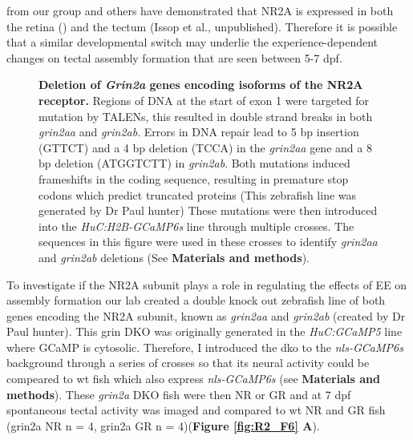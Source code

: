 from our group and others have demonstrated that NR2A is expressed in both the retina (\cite{Cox2005MolecularZebrafish}) and the tectum (Issop et al., unpublished). Therefore it is possible that a similar developmental switch may underlie the experience-dependent changes on tectal assembly formation that are seen between 5-7 \gls{dpf}.

\begin{figure}[!ht]
            \caption[\label{fig:R2_F5} \textbf{Deletion of \textit{grin2a} genes encoding isoforms of the NR2A receptor.}]{\label{fig:R2_F5} \textbf{Deletion of \textit{Grin2a} genes encoding isoforms of the NR2A receptor.} Regions of DNA at the start of exon 1 were targeted for mutation by TALENs, this resulted in double strand breaks in both \textit{grin2aa} and \textit{grin2ab}. Errors in DNA repair lead to 5 bp insertion (GTTCT) and a 4 bp deletion (TCCA) in the \textit{grin2aa} gene and a 8 bp deletion (ATGGTCTT) in \textit{grin2ab}. Both mutations induced frameshifts in the coding sequence, resulting in premature stop codons which predict truncated proteins (This zebrafish line was generated by Dr Paul hunter) These mutations were then introduced into the \textit{HuC:H2B-GCaMP6s} line through multiple crosses. The sequences in this figure were used in these crosses to identify \textit{grin2aa} and \textit{grin2ab} deletions (See \textbf{Materials and methods}).
            }
      \end{figure}


To investigate if the NR2A subunit plays a role in regulating the effects of EE on assembly formation our lab created a double knock out zebrafish line of both genes encoding the NR2A subunit, known as \textit{grin2aa} and \textit{grin2ab} (created by Dr Paul hunter). This \gls{grin} DKO was originally generated in the \textit{HuC:GCaMP5} line where GCaMP is cytosolic. Therefore, I introduced the \gls{dko} to the \textit{nls-GCaMP6s} background through a series of crosses so that its neural activity could be compeared to \gls{wt} fish which also express \textit{nls-GCaMP6s}  (see \textbf{Materials and methods}). These \textit{grin2a} DKO fish were then NR or GR and at 7 \gls{dpf} spontaneous tectal activity was imaged and compared to \gls{wt} NR and GR fish (\gls{grin2a} NR n = 4, \gls{grin2a} GR n = 4)(\textbf{Figure \ref{fig:R2_F6} A}). 

